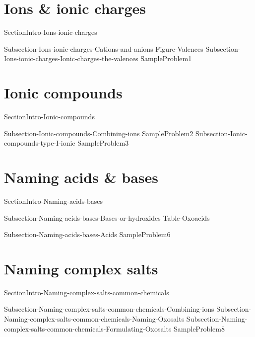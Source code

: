 \documentclass[main.tex]{subfiles}
\begin{document}
 
 \section{\faTint Ions \& ionic charges}
{SectionIntro-Ions-ionic-charges}
\sloppy\begin{description}
{Subsection-Ions-ionic-charges-Cations-and-anions}
{Figure-Valences}
{Subsection-Ions-ionic-charges-Ionic-charges-the-valences}
{SampleProblem1}
\end{description}
\section{\faTint Ionic compounds}
{SectionIntro-Ionic-compounds}
\sloppy \begin{description}
{Subsection-Ionic-compounds-Combining-ions}
{SampleProblem2}
{Subsection-Ionic-compounds-type-I-ionic}
{SampleProblem3}
\end{description}
 

\section{\faFlask Naming acids \& bases}
{SectionIntro-Naming-acids-bases}
\sloppy \begin{description}
{Subsection-Naming-acids-bases-Bases-or-hydroxides}
 {Table-Oxoacids}

{Subsection-Naming-acids-bases-Acids}
{SampleProblem6}
\end{description}
 
\section{\faTint  Naming complex salts }
{SectionIntro-Naming-complex-salts-common-chemicals}
\sloppy \begin{description}
{Subsection-Naming-complex-salts-common-chemicals-Combining-ions}
{Subsection-Naming-complex-salts-common-chemicals-Naming-Oxosalts}
{Subsection-Naming-complex-salts-common-chemicals-Formulating-Oxosalts}
{SampleProblem8}
\end{description}
\end{document}
